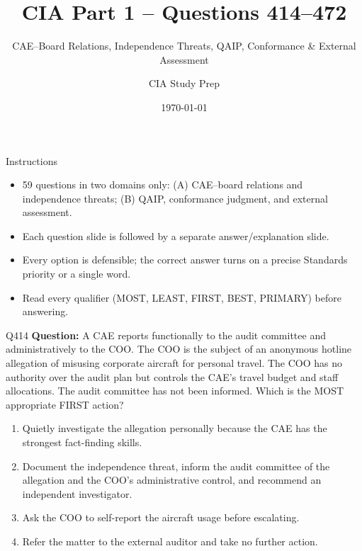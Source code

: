 \documentclass[aspectratio=169,10pt]{beamer}
\title{CIA Part 1 -- Questions 414--472}
\subtitle{CAE--Board Relations, Independence Threats, QAIP, Conformance \& External Assessment}
\author{CIA Study Prep}
\date{\today}
\begin{document}
	
	\begin{frame}
		\titlepage
	\end{frame}
	
	\begin{frame}{Instructions}
		\begin{itemize}
			\item 59 questions in two domains only: (A) CAE--board relations and independence threats; (B) QAIP, conformance judgment, and external assessment.
			\item Each question slide is followed by a separate answer/explanation slide.
			\item Every option is defensible; the correct answer turns on a precise Standards priority or a single word.
			\item Read every qualifier (MOST, LEAST, FIRST, BEST, PRIMARY) before answering.
		\end{itemize}
	\end{frame}
	
	
	\begin{frame}[t]{Q414}
		\small
		\textbf{Question:} A CAE reports functionally to the audit committee and administratively to the COO. The COO is the subject of an anonymous hotline allegation of misusing corporate aircraft for personal travel. The COO has no authority over the audit plan but controls the CAE's travel budget and staff allocations. The audit committee has not been informed. Which is the MOST appropriate FIRST action?
		\begin{enumerate}[label=\Alph*.,itemsep=1pt,topsep=2pt]
			\item Quietly investigate the allegation personally because the CAE has the strongest fact-finding skills.
			\item Document the independence threat, inform the audit committee of the allegation and the COO's administrative control, and recommend an independent investigator.
			\item Ask the COO to self-report the aircraft usage before escalating.
			\item Refer the matter to the external auditor and take no further action.
		\end{enumerate}
	\end{frame}
	
\end{document}

